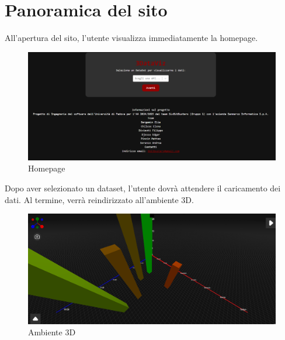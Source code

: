 \section{Panoramica del sito}
All'apertura del sito, l'utente visualizza immediatamente la homepage.
\begin{figure}[h!]
    \centering
    \includegraphics[scale=0.4]{template/images/homepage.png}
    \caption{Homepage}
\end{figure}
\newline
\newline
Dopo aver selezionato un dataset, l'utente dovrà attendere il caricamento dei dati. Al termine, verrà reindirizzato all'ambiente 3D.
\begin{figure}[h!]
    \centering
    \includegraphics[scale=0.39]{template/images/env3D.png}
    \caption{Ambiente 3D}
\end{figure}
